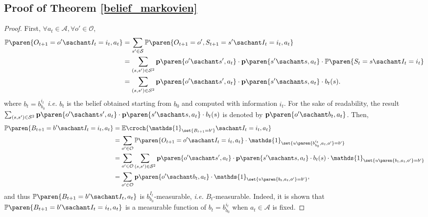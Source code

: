 \subsection{Proof of Theorem \ref{belief_markovien}}
\label{belief_markovien_RETURN}
\begin{proof}
First, $\forall a_t \in \mathcal{A}, \forall o' \in \mathcal{O}$,
\begin{align*}
\mathbb{P} \paren{ O_{t+1}=o' \sachant I_t = i_t, a_t } &= \sum_{s' \in \mathcal{S}} \mathbb{P} \paren{ O_{t+1} = o', S_{t+1} = s' \sachant I_t = i_t, a_t } \\
&= \sum_{(s,s') \in \mathcal{S}^2} \textbf{p} \paren{ o' \sachant s', a_t } \cdot \textbf{p} \paren{ s' \sachant s, a_t } \cdot \mathbb{P} \paren{ S_t=s \sachant I_t=i_t } \\
&= \sum_{(s,s') \in \mathcal{S}^2} \textbf{p} \paren{ o' \sachant s', a_t } \cdot \textbf{p} \paren{ s' \sachant s, a_t } \cdot b_t(s).
\end{align*}
where $b_t = b_{b_0}^{i_t}$ \textit{i.e.} $b_t$ is the belief obtained starting from $b_0$ 
and computed with information $i_t$.
For the sake of readability, 
the result $\sum_{(s,s') \in \mathcal{S}^2} \textbf{p} \paren{ o' \sachant s', a_t } \cdot \textbf{p} \paren{ s' \sachant s, a_t } \cdot b_t(s)$
is denoted by $\textbf{p} \paren{ o' \sachant b_t, a_t }$.
Then, 
\begin{align}
\nonumber \mathbb{P} \paren{ B_{t+1} = b' \sachant I_t=i_t, a_t } &= \mathbb{E} \croch{ \mathds{1}_{\set{ B_{t+1} = b' }} \sachant I_t = i_t, a_t }\\
\nonumber &= \sum_{o' \in \mathcal{O}} \mathbb{P} \paren{ O_{t+1} = o' \sachant I_t = i_t, a_t } \cdot \mathds{1}_{ \set{ u \paren{ b_{b_0}^{i_t}, a_t, o'} = b'} }\\
\nonumber &= \sum_{o' \in \mathcal{O}} \sum_{(s,s') \in \mathcal{S}^2} \textbf{p} \paren{ o' \sachant s', a_t } \cdot \textbf{p} \paren{ s' \sachant s, a_t } \cdot b_t(s) \cdot \mathds{1}_{ \set{ u \paren{ b_t, a_t, o'} = b'} } \\
\label{result_belief_markov} &= \sum_{o' \in \mathcal{O}} \textbf{p} \paren{ o' \sachant b_t, a_t } \cdot \mathds{1}_{ \set{ u \paren{ b_t, a_t, o'} = b'} },
\end{align}
and thus $\mathbb{P} \paren{ B_{t+1} = b' \sachant I_t, a_t }$ is $b^{I_t}_{b_0}$-measurable, \textit{i.e.} $B_t$-measurable.
Indeed, it is shown that $\mathbb{P} \paren{ B_{t+1} = b' \sachant I_t=i_t, a_t }$ is a measurable function of $b_t = b_{b_0}^{i_t}$
when $a_t \in \mathcal{A}$ is fixed.


\end{proof}
